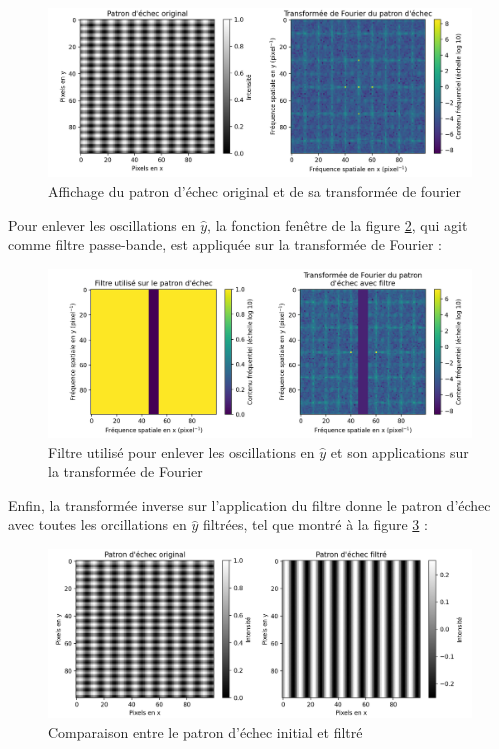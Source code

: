 \documentclass[11pt,letterpaper]{article}
\begin{document}
\begin{figure}[H]
  \centering
  \includegraphics[scale=0.68]{check.png}
  \caption{Affichage du patron d'échec original et de sa transformée de fourier}
  \label{echec_patron}
\end{figure}

Pour enlever les oscillations en $\hat{y}$, la fonction fenêtre de la figure \ref{echec_filtre}, qui agit comme filtre passe-bande, est appliquée sur la transformée de Fourier :

\begin{figure}[H]
  \centering
  \includegraphics[scale=0.68]{check_mask.png}
  \caption{Filtre utilisé pour enlever les oscillations en $\hat{y}$ et son applications sur la transformée de Fourier}
  \label{echec_filtre}
\end{figure}

Enfin, la transformée inverse sur l'application du filtre donne le patron d'échec avec toutes les orcillations en $\hat{y}$ filtrées, tel que montré à la figure \ref{echec_comp} :

\begin{figure}[H]
  \centering
  \includegraphics[scale=0.68]{check_filtre.png}
  \caption{Comparaison entre le patron d'échec initial et filtré}
  \label{echec_comp}
\end{figure}
\end{document}
